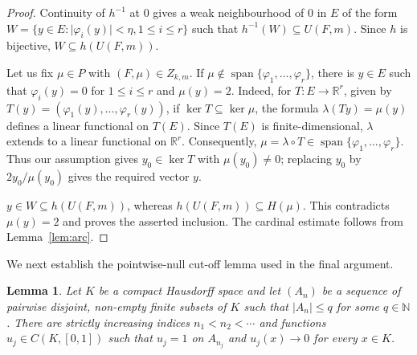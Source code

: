 \documentclass[a4paper]{amsart}
\newtheorem{lemma}[theorem]{Lemma}
\newcommand{\R}{\mathbb{R}}
\newcommand{\N}{\mathbb{N}}
\newcommand{\abs}[1]{\lvert #1\rvert}
\begin{document}
\begin{proof}
Continuity of $h^{-1}$ at $0$ gives a weak neighbourhood of $0$ in $E$
of the form $W=\{y\in E:\abs{\varphi_i(y)}<\eta,
1\leqslant i\leqslant r\}$ such that
$h^{-1}(W)\subseteq U(F,m)$.  Since $h$ is bijective,
$W\subseteq h(U(F,m))$.

Let us fix $\mu\in P$ with $(F,\mu)\in Z_{k,m}$.  If
$\mu\notin\operatorname{span}\{\varphi_1,\ldots,\varphi_r\}$, there is
$y\in E$ such that
$\varphi_i(y)=0$ for $1\leqslant i\leqslant r$ and $\mu(y)=2$.
Indeed, for $T\colon E\to\R^r$, given by
$T(y)=(\varphi_1(y),\ldots,\varphi_r(y))$, if
$\ker T\subseteq\ker\mu$, the formula $\lambda(Ty)=\mu(y)$ defines a
linear functional on $T(E)$.  Since $T(E)$ is finite-dimensional,
$\lambda$ extends to a linear functional on $\R^r$.  Consequently,
$\mu=\lambda\circ T\in\operatorname{span}\{\varphi_1,\ldots,\varphi_r\}$.
Thus our assumption gives $y_0\in\ker T$ with $\mu(y_0)\ne0$; replacing
$y_0$ by $2y_0/\mu(y_0)$ gives the required vector $y$.

$y\in W\subseteq h(U(F,m))$, whereas
$h(U(F,m))\subseteq H(\mu)$.  This contradicts $\mu(y)=2$ and proves
the asserted inclusion.  The cardinal estimate follows from
Lemma~\ref{lem:arc}.
\end{proof}

We next establish the pointwise-null cut-off lemma used in the final
argument.

\begin{lemma}\label{lem:cutoff}
Let $K$ be a compact Hausdorff space and let $(A_n)$ be a sequence of
pairwise disjoint, non-empty finite subsets of $K$ such that
$\abs{A_n}\leqslant q$ for some $q\in\N$.  There are strictly increasing
indices $n_1<n_2<\cdots$ and functions $u_j\in C(K,[0,1])$ such that
$u_j=1$ on $A_{n_j}$ and $u_j(x)\to0$ for every $x\in K$.
\end{lemma}
\end{document}
